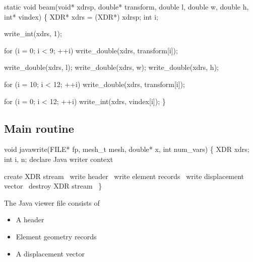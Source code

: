 \nwenddocs{}\endmoddef\nwstartdeflinemarkup{}\nwenddeflinemarkup
static void beam(void* xdrsp, double* transform, double l, double w, double h,
                 int* vindex)
\{
    XDR*  xdrs = (XDR*) xdrsp;
    int   i;

    write_int(xdrs, 1);

    for (i = 0; i < 9; ++i)
        write_double(xdrs, transform[i]);

    write_double(xdrs, l);
    write_double(xdrs, w);
    write_double(xdrs, h);

    for (i = 10; i < 12; ++i)
        write_double(xdrs, transform[i]);

    for (i = 0; i < 12; ++i)
        write_int(xdrs, vindex[i]);
\}

\nwendcode{}\nwdocspar


\subsection{Main routine}

\nwenddocs{}\endmoddef\nwstartdeflinemarkup{}\nwenddeflinemarkup
void javawrite(FILE* fp, mesh_t mesh, double* x, int num_vars)
\{
    XDR xdrs;
    int i, n;
    \LA{}declare Java writer context~{\nwtagstyle{}}\RA{}

    \LA{}create XDR stream~{\nwtagstyle{}}\RA{}
    \LA{}write header~{\nwtagstyle{}}\RA{}
    \LA{}write element records~{\nwtagstyle{}}\RA{}
    \LA{}write displacement vector~{\nwtagstyle{}}\RA{}
    \LA{}destroy XDR stream~{\nwtagstyle{}}\RA{}    
\}

\nwendcode{}\nwdocspar

The Java viewer file consists of
\begin{itemize}
  \item A header
  \item Element geometry records
  \item A displacement vector
\end{itemize}

